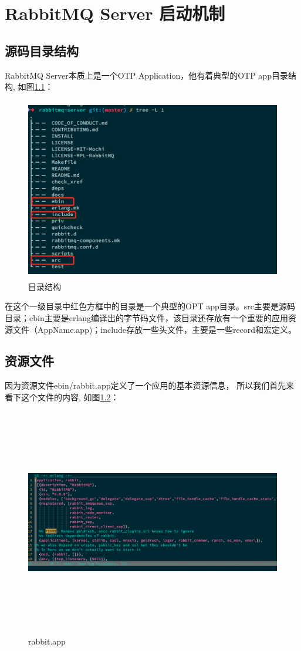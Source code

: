 \chapter{RabbitMQ Server 启动机制}

\section{源码目录结构} 
 
RabbitMQ Server本质上是一个OTP Application，他有着典型的OTP app目录结构, 如图\ref{Fig:ch1/directory}：
\begin{figure}[h]
	\includegraphics[height=8cm]{img/ch1/directory.jpeg}
	\caption{\label{Fig:ch1/directory}目录结构}
\end{figure}

在这个一级目录中红色方框中的目录是一个典型的OPT app目录。src主要是源码目录；ebin主要是erlang编译出的字节码文件，该目录还存放有一个重要的应用资源文件（AppName.app)；include存放一些头文件，主要是一些record和宏定义。

\section{资源文件} 
因为资源文件ebin/rabbit.app定义了一个应用的基本资源信息， 所以我们首先来看下这个文件的内容, 如图\ref{Fig:ch1/rabbit_app}：
\begin{figure}[h]
	\includegraphics[height=10cm]{img/ch1/rabbit_app.jpeg}
	\caption{\label{Fig:ch1/rabbit_app}rabbit.app}
\end{figure}

